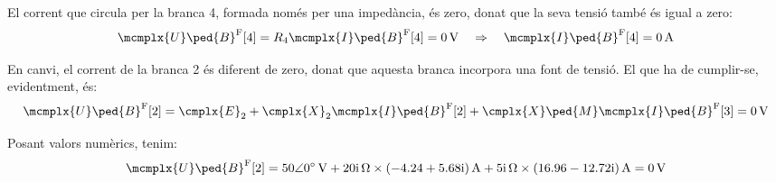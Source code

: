 \begin{exemple}
    El corrent que circula per la branca 4, formada només per una impedància, és zero, donat que la seva tensió també és igual a zero:
    \[
        \mcmplx{U}\ped{B}^{\text{F}}[4] = R_4 \mcmplx{I}\ped{B}^{\text{F}}[4]  = \qty{0}{V} \quad  \Rightarrow \quad  \mcmplx{I}\ped{B}^{\text{F}}[4] = \qty{0}{A}
    \]

    En canvi, el corrent de la branca 2 és diferent de zero, donat que aquesta branca incorpora una font de tensió.
    El que ha de cumplir-se, evidentment, és:
    \[
        \mcmplx{U}\ped{B}^{\text{F}}[2] = \cmplx{E}_2 + \cmplx{X}_2 \mcmplx{I}\ped{B}^{\text{F}}[2] + \cmplx{X}\ped{M} \mcmplx{I}\ped{B}^{\text{F}}[3] = \qty{0}{V}
    \]

   Posant valors numèrics, tenim:
    \[
      \mcmplx{U}\ped{B}^{\text{F}}[2] = \complexqty{50:0}{V} + \complexqty{j20}{\ohm} \times
        \complexqty{-4,24+j5,68}{A} + \complexqty{j5}{\ohm} \times \complexqty{16,96-j12,72}{A} = \qty{0}{V}
    \]
\end{exemple}

